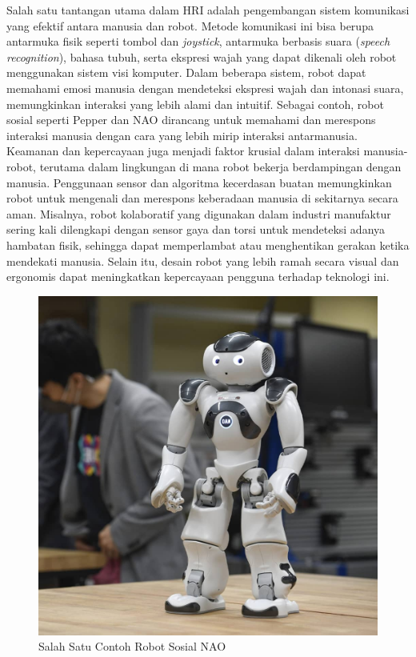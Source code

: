 Salah satu tantangan utama dalam HRI adalah pengembangan sistem komunikasi yang efektif antara manusia dan robot\parencite{QifanZhang_tlihrifamoagdwqr}.
Metode komunikasi ini bisa berupa antarmuka fisik seperti tombol dan \emph{joystick}, antarmuka berbasis suara (\emph{speech recognition}),
bahasa tubuh, serta ekspresi wajah yang dapat dikenali oleh robot menggunakan sistem visi komputer. Dalam beberapa sistem,
robot dapat memahami emosi manusia dengan mendeteksi ekspresi wajah dan intonasi suara, memungkinkan interaksi yang lebih alami dan
intuitif. Sebagai contoh, robot sosial seperti Pepper dan NAO dirancang untuk memahami dan merespons interaksi manusia dengan cara
yang lebih mirip interaksi antarmanusia. Keamanan dan kepercayaan juga menjadi faktor krusial dalam interaksi manusia-robot,
terutama dalam lingkungan di mana robot bekerja berdampingan dengan manusia. Penggunaan sensor dan algoritma kecerdasan buatan
memungkinkan robot untuk mengenali dan merespons keberadaan manusia di sekitarnya secara aman. Misalnya, robot kolaboratif yang
digunakan dalam industri manufaktur sering kali dilengkapi dengan sensor gaya dan torsi untuk mendeteksi adanya hambatan fisik,
sehingga dapat memperlambat atau menghentikan gerakan ketika mendekati manusia. Selain itu, desain robot yang lebih ramah secara
visual dan ergonomis dapat meningkatkan kepercayaan pengguna terhadap teknologi ini.  

\begin{figure} [H] \centering
    \includegraphics[scale=0.2]{gambar/NAO_robot.jpg}
    \caption{Salah Satu Contoh Robot Sosial NAO}
    \label{fig:HRI_NAO_daster}
\end{figure}


